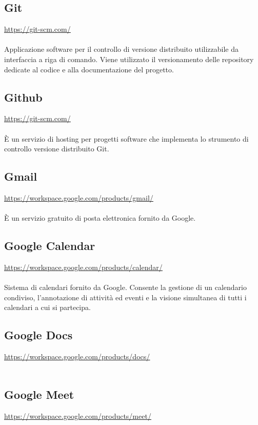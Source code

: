 \documentclass[a4paper,12pt]{article}
\begin{document}
\subsection{Git} \label{strumenti:git}
\underline{\url{https://git-scm.com/}} \\\\
Applicazione software per il controllo di versione distribuito utilizzabile da interfaccia a riga di comando. Viene utilizzato il versionamento delle repository dedicate al codice e alla documentazione del progetto.

\subsection{Github} \label{strumenti:github}
\underline{\url{https://git-scm.com/}} \\\\
È un servizio di hosting per progetti software che implementa lo strumento di controllo versione distribuito Git.  

\subsection{Gmail} \label{strumenti:gmail}
\underline{\url{https://workspace.google.com/products/gmail/}} \\\\
È un servizio gratuito di posta elettronica fornito da Google.

\subsection{Google Calendar} \label{strumenti:googleCalendar}
\underline{\url{https://workspace.google.com/products/calendar/}} \\\\
Sistema di calendari fornito da Google. Consente la gestione di un calendario condiviso, l'annotazione di attività ed eventi e la visione simultanea di tutti i calendari a cui si partecipa.


\subsection{Google Docs} \label{strumenti:googleDocs}
\underline{\url{https://workspace.google.com/products/docs/}} \\\\


\subsection{Google Meet} \label{strumenti:googleMeet}
\underline{\url{https://workspace.google.com/products/meet/}} \\\\
\end{document}
